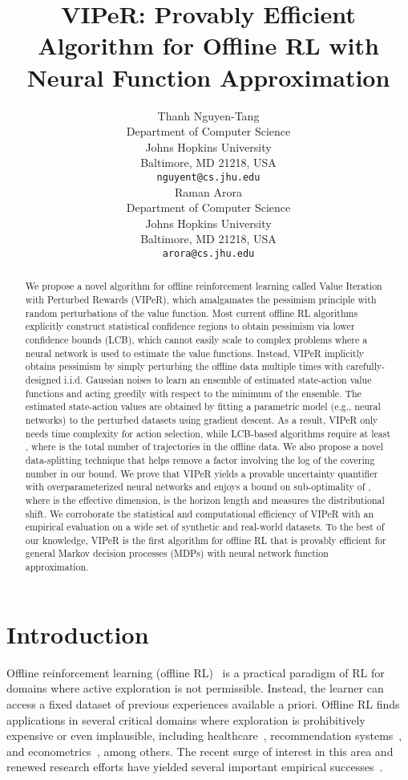 \documentclass{article} \usepackage{iclr2023/iclr2023_conference,times}
\title{VIPeR: Provably Efficient Algorithm for Offline RL with Neural Function Approximation}
\author{Thanh Nguyen-Tang \\
Department of Computer Science\\
Johns Hopkins University\\
Baltimore, MD 21218, USA \\
\texttt{nguyent@cs.jhu.edu} \\
\And
Raman Arora \\
Department of Computer Science\\
Johns Hopkins University\\
Baltimore, MD 21218, USA \\
\texttt{arora@cs.jhu.edu} \\
}
\begin{document}
\maketitle

\begin{abstract}
We propose a novel algorithm for offline reinforcement learning called Value Iteration with Perturbed Rewards (VIPeR), which amalgamates the pessimism principle with random perturbations of the value function. Most current offline RL algorithms explicitly construct statistical confidence regions to obtain pessimism via lower confidence bounds (LCB), which cannot easily scale to complex problems where a neural network is used to estimate the value functions. Instead, VIPeR implicitly obtains pessimism by simply perturbing the offline data multiple times with carefully-designed i.i.d. Gaussian noises to learn an ensemble of estimated state-action {value functions} and acting greedily with respect to the minimum of the ensemble. The estimated state-action values are obtained by fitting a parametric model (e.g., neural networks) to the perturbed datasets using gradient descent. As a result, VIPeR only needs  time complexity for action selection, while LCB-based algorithms require at least , where  is the total number of trajectories in the offline data. We also propose a novel data-splitting technique that helps remove a factor involving the log of the covering number in our bound. We prove that VIPeR yields a provable uncertainty quantifier with overparameterized neural networks and enjoys a bound on sub-optimality of , where  is the effective dimension,  is the horizon length and  measures the distributional shift. We corroborate the statistical and computational efficiency of VIPeR with an empirical evaluation on a wide set of synthetic and real-world datasets. To the best of our knowledge, VIPeR is the first algorithm for offline RL that is provably efficient for general Markov decision processes (MDPs) with neural network function approximation. 



%
 \end{abstract}

\section{Introduction}
Offline reinforcement learning (offline RL)~\citep{lange2012batch,levine2020offline} is a practical paradigm of RL for domains where active exploration is not permissible. Instead, the learner can access a fixed dataset of previous experiences available a priori. Offline RL finds applications in several critical domains where exploration is prohibitively expensive or even implausible, including healthcare~\citep{gottesman2019guidelines, nie2021learning}, recommendation systems~\citep{strehl2010learning, thomasAAAI17}, and  econometrics~\citep{Kitagawa18, athey2021policy}, among others. The recent surge of interest in this area and renewed research efforts have yielded several important empirical successes~\citep{chen2021decision, wang2022diffusion, wang2022bootstrapped, meng2021offline}. 
\end{document}

